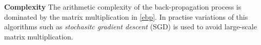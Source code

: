 
{\bf Complexity} The arithmetic complexity of the back-propagation process is dominated by the matrix multiplication in \eqref{ebp}. In practise variations of this algorithms such as \textit{stochasitc gradient descent} (SGD) is used to avoid large-scale matrix multiplication.

